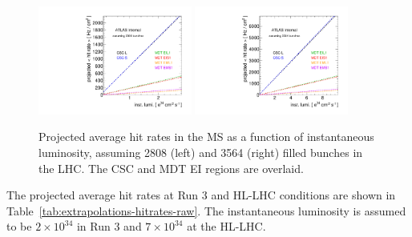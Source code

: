 \begin{figure}
  \begin{center}
    \includegraphics[width=0.45\textwidth]{./figures/extrapolate_vs_lumi_raw_2808.pdf}
    \includegraphics[width=0.45\textwidth]{./figures/extrapolate_vs_lumi_raw_3564.pdf}
    \caption{Projected average hit rates in the MS as a function of instantaneous luminosity, assuming 2808 (left) and 3564 (right) filled bunches in the LHC. The CSC and MDT EI regions are overlaid.}
    \label{fig:extrapolations-hitrates-raw}
  \end{center}
\end{figure}

The projected average hit rates at Run 3 and HL-LHC conditions are shown in Table~\ref{tab:extrapolations-hitrates-raw}. The instantaneous luminosity is assumed to be $2\times10^{34}$ in Run 3 and $7\times10^{34}$ at the HL-LHC. 

